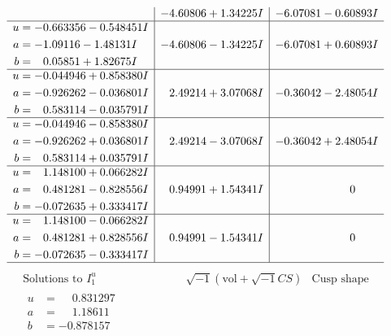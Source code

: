 \documentclass[1p]{elsarticle_modified}
\theoremstyle{definition}
\newcommand{\I}{\sqrt{-1}}
\begin{document}
$$\begin{array}{c|c|c}
 & -4.60806 + 1.34225 I & -6.07081 - 0.60893 I \\ \hline\begin{aligned}
u &= -0.663356 - 0.548451 I \\
a &= -1.09116 - 1.48131 I \\
b &= \phantom{-}0.05851 + 1.82675 I\end{aligned}
 & -4.60806 - 1.34225 I & -6.07081 + 0.60893 I \\ \hline\begin{aligned}
u &= -0.044946 + 0.858380 I \\
a &= -0.926262 - 0.036801 I \\
b &= \phantom{-}0.583114 - 0.035791 I\end{aligned}
 & \phantom{-}2.49214 + 3.07068 I & -0.36042 - 2.48054 I \\ \hline\begin{aligned}
u &= -0.044946 - 0.858380 I \\
a &= -0.926262 + 0.036801 I \\
b &= \phantom{-}0.583114 + 0.035791 I\end{aligned}
 & \phantom{-}2.49214 - 3.07068 I & -0.36042 + 2.48054 I \\ \hline\begin{aligned}
u &= \phantom{-}1.148100 + 0.066282 I \\
a &= \phantom{-}0.481281 - 0.828556 I \\
b &= -0.072635 + 0.333417 I\end{aligned}
 & \phantom{-}0.94991 + 1.54341 I & \phantom{-0.000000 } 0 \\ \hline\begin{aligned}
u &= \phantom{-}1.148100 - 0.066282 I \\
a &= \phantom{-}0.481281 + 0.828556 I \\
b &= -0.072635 - 0.333417 I\end{aligned}
 & \phantom{-}0.94991 - 1.54341 I & \phantom{-0.000000 } 0\\
 \hline 
 \end{array}$$\newpage$$\begin{array}{c|c|c}  
\text{Solutions to }I^u_{1}& \I (\text{vol} + \sqrt{-1}CS) & \text{Cusp shape}\\
 \hline 
\begin{aligned}
u &= \phantom{-}0.831297\phantom{ +0.000000I} \\
a &= \phantom{-}1.18611\phantom{ +0.000000I} \\
b &= -0.878157\phantom{ +0.000000I}\end{aligned}

\end{array}$$
\end{document}
